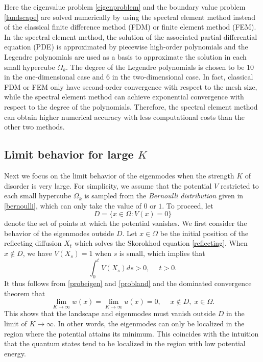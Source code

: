 \documentclass[a4paper,11pt]{article}
\begin{document}
Here the eigenvalue problem \eqref{eigenproblem} and the boundary value problem \eqref{landscape} are solved numerically by using the spectral element method instead of the classical finite difference method (FDM) or finite element method (FEM). In the spectral element method, the solution of the associated partial differential equation (PDE) is approximated by piecewise high-order polynomials and the Legendre polynomials are used as a basis to approximate the solution in each small hypercube $\Omega_k$. The degree of the Legendre polynomials is chosen to be $10$ in the one-dimensional case and $6$ in the two-dimensional case. In fact, classical FDM or FEM only have second-order convergence with respect to the mesh size, while the spectral element method can achieve exponential convergence with respect to the degree of the polynomials. Therefore, the spectral element method can obtain higher numerical accuracy with less computational costs than the other two methods.

\subsection{Limit behavior for large $K$}
Next we focus on the limit behavior of the eigenmodes when the strength $K$ of disorder is very large. For simplicity, we assume that the potential $V$ restricted to each small hypercube $\Omega_k$ is sampled from the \emph{Bernoulli distribution} given in \eqref{bernoulli}, which can only take the value of $0$ or $1$. To proceed, let
\begin{equation*}
D = \{x \in \Omega: V(x) = 0\}
\end{equation*}
denote the set of points at which the potential vanishes. We first consider the behavior of the eigenmodes outside $D$. Let $x\in\Omega$ be the initial position of the reflecting diffusion $X_t$ which solves the Skorokhod equation \eqref{reflecting}. When $x \notin D$, we have $V(X_s) = 1$ when $s$ is small, which implies that
\begin{equation*}
\int_{0}^{t} V(X_s) ds > 0, \quad \; t > 0.
\end{equation*}
It thus follows from \eqref{probeigen} and \eqref{probland} and the dominated convergence theorem that
\begin{equation}\label{largeK}
\lim_{K \rightarrow \infty} w(x) = \lim_{K \rightarrow \infty} u(x) = 0, \quad \; x \notin D,\;x \in \Omega.
\end{equation}
This shows that the landscape and eigenmodes must vanish outside $D$ in the limit of $K\rightarrow\infty$. In other words, the eigenmodes can only be localized in the region where the potential attains its minimum. This coincides with the intuition that the quantum states tend to be localized in the region with low potential energy.
\end{document}
